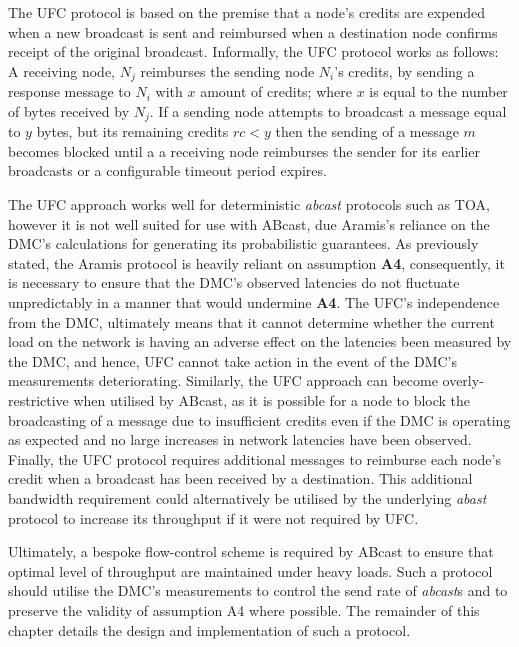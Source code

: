 
The \textsf{UFC} protocol is based on the premise that a node's credits are expended when a new broadcast is sent and reimbursed when a destination node confirms receipt of the original broadcast.  Informally, the \textsf{UFC} protocol works as follows: A receiving node, $N_j$ reimburses the sending node $N_i$'s credits, by sending a response message to $N_i$ with $x$ amount of credits; where $x$ is equal to the number of bytes received by $N_j$.  If a sending node  attempts to broadcast a message equal to $y$ bytes, but its remaining credits $rc < y$ then the sending of a message $m$ becomes blocked until a a receiving node reimburses the sender for its earlier broadcasts or a configurable timeout period expires.  

The \textsf{UFC} approach works well for deterministic \emph{abcast} protocols such as TOA, however it is not well suited for use with \textsf{ABcast}, due \textsf{Aramis}'s reliance on the DMC's calculations for generating its probabilistic guarantees.  As previously stated, the \textsf{Aramis} protocol is heavily reliant on assumption \textbf{A4}, consequently, it is necessary to ensure that the DMC's observed latencies do not fluctuate unpredictably in a manner that would undermine \textbf{A4}.  The \textsf{UFC}'s independence from the DMC, ultimately means that it cannot determine whether the current load on the network is having an adverse effect on the latencies been measured by the DMC, and hence, \textsf{UFC} cannot take action in the event of the DMC's measurements deteriorating.  Similarly, the \textsf{UFC} approach can become overly-restrictive when utilised by \textsf{ABcast}, as it is possible for a node to block the broadcasting of a message due to insufficient credits even if the DMC is operating as expected and no large increases in network latencies have been observed.  Finally, the \textsf{UFC} protocol requires additional messages to reimburse each node's credit when a broadcast has been received by a destination.  This additional bandwidth requirement could alternatively be utilised by the underlying \emph{abast} protocol to increase its throughput if it were not required by \textsf{UFC}.  

Ultimately, a bespoke flow-control scheme is required by \textsf{ABcast} to ensure that optimal level of throughput are maintained under heavy loads.  Such a protocol should utilise the DMC's measurements to control the send rate of \emph{abcast}s and to preserve the validity of assumption A4 where possible.  The remainder of this chapter details the design and implementation of such a protocol.  

